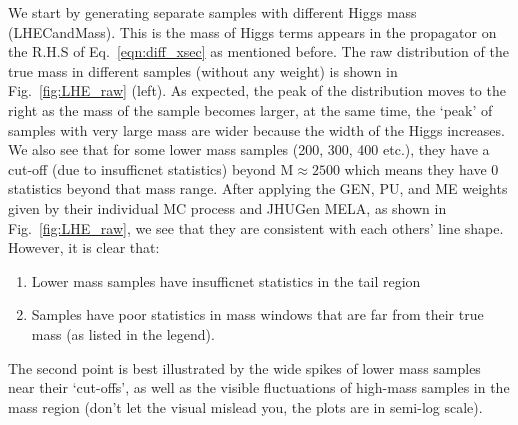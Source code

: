 We start by generating separate samples with different Higgs mass (LHECandMass).
This is the mass of Higgs terms appears in the propagator on 
the R.H.S of Eq.~\ref{eqn:diff_xsec} as mentioned before. The raw distribution of the true mass
in different samples (without any weight) is shown in Fig.~\ref{fig:LHE_raw} (left). As expected, 
the peak of the distribution moves to the right as the mass of the sample becomes larger, at the
same time, the `peak' of samples with very large mass are wider because the width of the Higgs increases.
We also see that for some lower mass
samples (200, 300, 400 etc.), they have a cut-off (due to insufficnet statistics) beyond $\mathrm{M}\approx2500$ which means they have 0
statistics beyond that mass range. After applying the GEN, PU, and ME weights given by their
individual MC process and JHUGen MELA, as shown in Fig.~\ref{fig:LHE_raw},
we see that they are consistent with each others' line shape. However, it is clear
that:
\begin{enumerate}[label=(\roman*)]
    \item Lower mass samples have insufficnet statistics in the tail region
    \item Samples have poor statistics in mass windows that are 
        far from their true mass (as listed in the legend).
\end{enumerate}
The second point is best illustrated by the wide spikes of lower mass samples near their `cut-offs',
as well as the visible fluctuations of high-mass samples in the mass region (don't let the 
visual mislead you, the plots are in semi-log scale).
